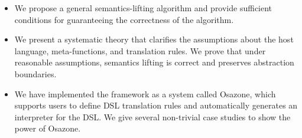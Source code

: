 \begin{itemize}
  \item We propose a general semantics-lifting algorithm and provide sufficient conditions for guaranteeing the correctness of the algorithm. 
  \item We present a systematic theory that clarifies the assumptions about the host language, meta-functions, and translation rules. 
  We prove that under  reasonable assumptions, semantics lifting is correct and preserves abstraction boundaries. 
  \item We have implemented the framework as a system called Osazone, which supports users to define DSL translation rules and automatically generates an interpreter for the DSL. We give several non-trivial case studies to show the power of Osazone.
\end{itemize}
